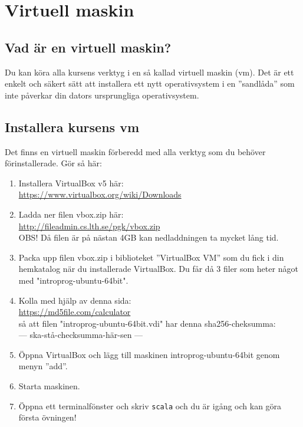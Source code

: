 
\chapter{Virtuell maskin}\label{appendix:vbox}

\section{Vad är en virtuell maskin?}

Du kan köra alla kursens verktyg i en så kallad virtuell maskin (vm). Det är ett enkelt och säkert sätt att installera ett nytt operativsystem i en ''sandlåda'' som inte påverkar din dators ursprungliga operativsystem. 

\section{Installera kursens vm}
Det finns en virtuell maskin förberedd med alla verktyg som du behöver förinstallerade. Gör så här:
\begin{enumerate}
\item     Installera VirtualBox v5 här: \\ \url{https://www.virtualbox.org/wiki/Downloads}
\item     Ladda ner filen vbox.zip här: \\ \url{http://fileadmin.cs.lth.se/pgk/vbox.zip} \\ OBS! Då filen är på nästan 4GB kan nedladdningen ta mycket lång tid.
\item     Packa upp filen vbox.zip i biblioteket ''VirtualBox VM'' som du fick i din hemkatalog när du installerade VirtualBox. Du får då 3 filer som heter något med "introprog-ubuntu-64bit".
\item     Kolla med hjälp av denna sida: \\ \url{https://md5file.com/calculator} \\ så att filen "introprog-ubuntu-64bit.vdi" har denna sha256-cheksumma: \\ --- ska-stå-checksumma-här-sen ---
\item     Öppna VirtualBox och lägg till maskinen introprog-ubuntu-64bit genom menyn ''add''.
\item     Starta maskinen.
\item     Öppna ett terminalfönster och skriv \texttt{scala} och du är igång och kan göra första övningen!
\end{enumerate}

